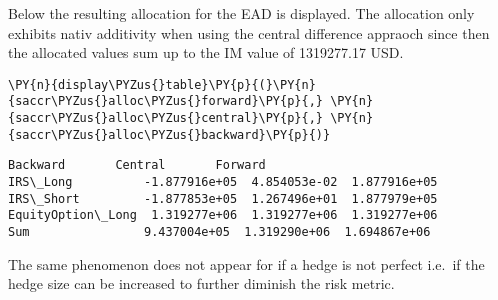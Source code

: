     Below the resulting allocation for the EAD is displayed. The allocation
only exhibits nativ additivity when using the central difference
appraoch since then the allocated values sum up to the IM value of
1319277.17 USD.

    
    \begin{tcolorbox}[breakable, size=fbox, boxrule=1pt, pad at break*=1mm,colback=cellbackground, colframe=cellborder]
\begin{Verbatim}[commandchars=\\\{\}]
\PY{n}{display\PYZus{}table}\PY{p}{(}\PY{n}{saccr\PYZus{}alloc\PYZus{}forward}\PY{p}{,} \PY{n}{saccr\PYZus{}alloc\PYZus{}central}\PY{p}{,} \PY{n}{saccr\PYZus{}alloc\PYZus{}backward}\PY{p}{)}
\end{Verbatim}
\end{tcolorbox}

            \begin{tcolorbox}[breakable, size=fbox, boxrule=.5pt, pad at break*=1mm, opacityfill=0]
\begin{Verbatim}[commandchars=\\\{\}]
                       Backward       Central       Forward
IRS\_Long          -1.877916e+05  4.854053e-02  1.877916e+05
IRS\_Short         -1.877853e+05  1.267496e+01  1.877979e+05
EquityOption\_Long  1.319277e+06  1.319277e+06  1.319277e+06
Sum                9.437004e+05  1.319290e+06  1.694867e+06
\end{Verbatim}
\end{tcolorbox}
        
    The same phenomenon does not appear for if a hedge is not perfect
i.e.~if the hedge size can be increased to further diminish the risk
metric.

